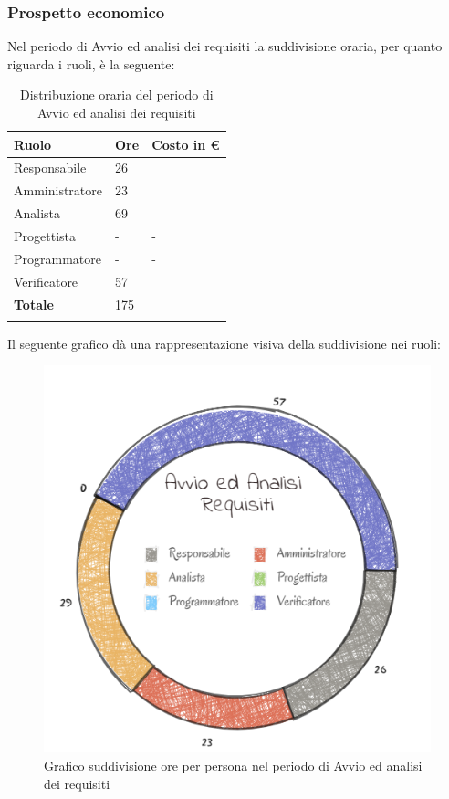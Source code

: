 \subsubsection{Prospetto economico}
Nel periodo di Avvio ed analisi dei requisiti la suddivisione oraria, per quanto riguarda i ruoli, è la seguente: 

\begin{longtable}{| C{.30\textwidth}| C{.15\textwidth}| C{.20\textwidth}|}
\hline
\textbf{Ruolo} & \textbf{Ore} & \textbf{Costo in \euro} \\
\hline
Responsabile & 26 &  \\
\hline
Amministratore & 23 &  \\
\hline
Analista & 69 &  \\
\hline
Progettista & - & - \\
\hline
Programmatore & - & - \\
\hline
Verificatore & 57 & \\
\hline
\textbf{Totale} & 175 &  \\
\hline

\caption{Distribuzione oraria del periodo di Avvio ed analisi dei requisiti}
\label{tabella distribuzione oraria del periodo di Avvio ed analisi dei requisiti}
\end{longtable}

Il seguente grafico dà una rappresentazione visiva della suddivisione nei ruoli:
\begin{figure}[H]
	\centering
  		\includegraphics[width=0.8\linewidth]{./images/torta_aar.png}
  		\caption{Grafico suddivisione ore per persona nel periodo di Avvio ed analisi dei requisiti}
  		\label{fig:grafico suddivione ruoli periodo di Avvio ed analisi dei requisiti}
\end{figure}

